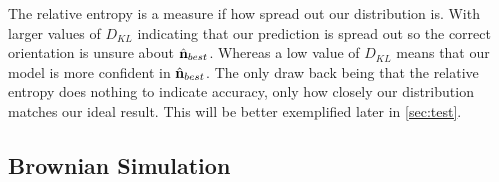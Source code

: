 The relative entropy is a measure if how spread out our distribution
is. With larger values of $D_{KL}$ indicating that our prediction is 
spread out so the correct orientation is unsure about $\hat{\bf n}_
{best}$. Whereas a low value of $D_{KL}$ means that our model is more 
confident in $\hat{\bf n}_{best}$. The only draw back being that the 
relative entropy does nothing to indicate accuracy, only how closely 
our distribution matches our ideal result. This will be better 
exemplified later in \ref{sec:test}.
\subsection{Brownian Simulation}
\label{sec:brownian}

